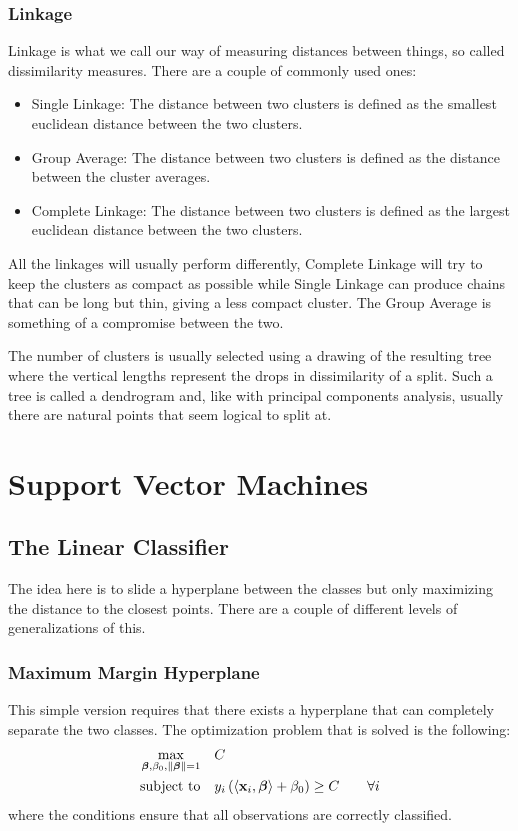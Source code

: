 \documentclass[a4paper, 12pt]{scrartcl}
\newcommand{\bfbeta}{\boldsymbol{\beta}}
\newcommand{\bfx}{\mathbf{x}}
\newcommand{\inner}[2]{\left\langle #1, #2 \right\rangle}
\begin{document}
\subsubsection*{Linkage}
Linkage is what we call our way of measuring distances between things, so called dissimilarity measures.
There are a couple of commonly used ones:
\begin{itemize}
	\item Single Linkage: The distance between two clusters is defined as the smallest euclidean distance between the two clusters.
	\item Group Average: The distance between two clusters is defined as the distance between the cluster averages.
	\item Complete Linkage: The distance between two clusters is defined as the largest euclidean distance between the two clusters.
\end{itemize}
All the linkages will usually perform differently, Complete Linkage will try to keep the clusters as compact as possible while Single Linkage can produce chains that can be long but thin, giving a less compact cluster.
The Group Average is something of a compromise between the two.

The number of clusters is usually selected using a drawing of the resulting tree where the vertical lengths represent the drops in dissimilarity of a split.
Such a tree is called a dendrogram and, like with principal components analysis, usually there are natural points that seem logical to split at.

\section{Support Vector Machines}
\subsection{The Linear Classifier}
The idea here is to slide a hyperplane between the classes but only maximizing the distance to the closest points.
There are a couple of different levels of generalizations of this.
\subsubsection*{Maximum Margin Hyperplane}
\begin{algorithm}
This simple version requires that there exists a hyperplane that can completely separate the two classes.
The optimization problem that is solved is the following:
\begin{equation*}
	\begin{aligned}
	\operatornamewithlimits{max}_{\bfbeta,\beta_0,\|\bfbeta\|=1} & & &C\\
	\text{subject to} & & & y_i\left(\inner{\bfx_i}{\bfbeta}+\beta_0\right)\geq C\qquad\forall i
	\end{aligned}
\end{equation*}
where the conditions ensure that all observations are correctly classified.
\end{algorithm}
\end{document}

